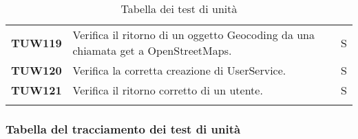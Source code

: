 \documentclass[../../piano-di-qualifica.tex]{subfiles}
\begin{document}
\begin{longtable}[H]{>{\centering\bfseries}m{3cm} >{}m{10cm} >{\centering\arraybackslash}m{3cm}}
  TUW119             & Verifica il ritorno di un oggetto Geocoding da una chiamata get a OpenStreetMaps.                                   & S                             \\


  TUW120             & Verifica la corretta creazione di UserService.                                                                      & S                             \\

  TUW121             & Verifica il ritorno corretto di un utente.                                                                          & S                             \\

  \rowcolor{white}
  \caption{Tabella dei test di unità}%
  \label{tab:test_di_unita}
\end{longtable}


\subsubsection{Tabella del tracciamento dei test di unità}%
\label{subsub:tabella_tracciamento_test_di_unita}
\end{document}

